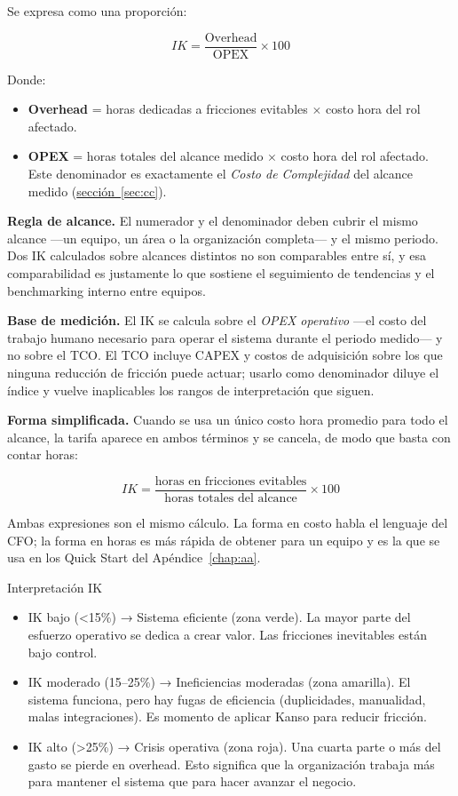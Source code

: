 Se expresa como una proporción:

\[
IK = \frac{\text{Overhead}}{\text{OPEX}} \times 100
\]

Donde:
\begin{itemize}
    \item \textbf{Overhead} = horas dedicadas a fricciones evitables $\times$ costo hora del rol afectado.
    \item \textbf{OPEX} = horas totales del alcance medido $\times$ costo hora del rol afectado. Este denominador es exactamente el \textit{Costo de Complejidad} del alcance medido (\hyperref[sec:cc]{sección~\ref{sec:cc}}).
\end{itemize}

\textbf{Regla de alcance.} El numerador y el denominador deben cubrir el mismo alcance
---un equipo, un área o la organización completa--- y el mismo periodo. Dos IK calculados sobre
alcances distintos no son comparables entre sí, y esa comparabilidad es justamente lo que sostiene
el seguimiento de tendencias y el benchmarking interno entre equipos.

\textbf{Base de medición.} El IK se calcula sobre el \textit{OPEX operativo} ---el costo del
trabajo humano necesario para operar el sistema durante el periodo medido--- y no sobre el TCO.
El TCO incluye CAPEX y costos de adquisición sobre los que ninguna reducción de fricción puede
actuar; usarlo como denominador diluye el índice y vuelve inaplicables los rangos de
interpretación que siguen.

\textbf{Forma simplificada.} Cuando se usa un único costo hora promedio para todo el alcance, la
tarifa aparece en ambos términos y se cancela, de modo que basta con contar horas:

\[
IK = \frac{\text{horas en fricciones evitables}}{\text{horas totales del alcance}} \times 100
\]

Ambas expresiones son el mismo cálculo. La forma en costo habla el lenguaje del CFO; la forma en
horas es más rápida de obtener para un equipo y es la que se usa en los Quick Start del
Apéndice~\ref{chap:aa}.

Interpretación IK
\begin{itemize}
    \item IK bajo (<15\%) → Sistema eficiente (zona verde). La mayor parte del esfuerzo operativo se dedica a crear valor. Las fricciones inevitables están bajo control.
    \item IK moderado (15--25\%) → Ineficiencias moderadas (zona amarilla). El sistema funciona, pero hay fugas de eficiencia (duplicidades, manualidad, malas integraciones). Es momento de aplicar Kanso para reducir fricción.
    \item IK alto (>25\%) → Crisis operativa (zona roja). Una cuarta parte o más del gasto se pierde en overhead. Esto significa que la organización trabaja más para mantener el sistema que para hacer avanzar el negocio.
\end{itemize}

